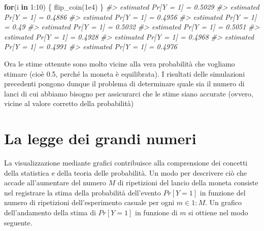 \documentclass[
  11pt,
]{krantz}
\makeatletter
\newenvironment{Shaded}{\begin{snugshade}}{\end{snugshade}}
\newcommand{\CommentTok}[1]{\textcolor[rgb]{0.37,0.37,0.37}{\textit{#1}}}
\newcommand{\ControlFlowTok}[1]{\textcolor[rgb]{0.27,0.27,0.27}{\textbf{#1}}}
\newcommand{\DecValTok}[1]{\textcolor[rgb]{0.06,0.06,0.06}{#1}}
\newcommand{\FloatTok}[1]{\textcolor[rgb]{0.06,0.06,0.06}{#1}}
\newcommand{\FunctionTok}[1]{\textcolor[rgb]{0,0,0}{#1}}
\newcommand{\NormalTok}[1]{#1}
\newcommand{\SpecialCharTok}[1]{\textcolor[rgb]{0,0,0}{#1}}
\newenvironment{kframe}{%
\medskip{}
\setlength{\fboxsep}{.8em}
 \def\at@end@of@kframe{}%
 \ifinner\ifhmode%
  \def\at@end@of@kframe{\end{minipage}}%
  \begin{minipage}{\columnwidth}%
 \fi\fi%
 \def\FrameCommand##1{\hskip\@totalleftmargin \hskip-\fboxsep
 \colorbox{shadecolor}{##1}\hskip-\fboxsep
     \hskip-\linewidth \hskip-\@totalleftmargin \hskip\columnwidth}%
 \MakeFramed {\advance\hsize-\width
   \@totalleftmargin\z@ \linewidth\hsize
   \@setminipage}}%
 {\par\unskip\endMakeFramed%
 \at@end@of@kframe}
\renewenvironment{Shaded}{\begin{kframe}}{\end{kframe}}
\theoremstyle{definition}
\theoremstyle{definition}
\theoremstyle{definition}
\theoremstyle{definition}
\theoremstyle{remark}
\makeatother
\begin{document}
\begin{Shaded}
\begin{Highlighting}[]
\ControlFlowTok{for}\NormalTok{(i }\ControlFlowTok{in} \DecValTok{1}\SpecialCharTok{:}\DecValTok{10}\NormalTok{) \{}
  \FunctionTok{flip\_coin}\NormalTok{(}\FloatTok{1e4}\NormalTok{)}
\NormalTok{\}}
\CommentTok{\#\textgreater{} estimated Pr[Y = 1] = 0.5029 }
\CommentTok{\#\textgreater{} estimated Pr[Y = 1] = 0.4886 }
\CommentTok{\#\textgreater{} estimated Pr[Y = 1] = 0.4956 }
\CommentTok{\#\textgreater{} estimated Pr[Y = 1] = 0.49 }
\CommentTok{\#\textgreater{} estimated Pr[Y = 1] = 0.5032 }
\CommentTok{\#\textgreater{} estimated Pr[Y = 1] = 0.5051 }
\CommentTok{\#\textgreater{} estimated Pr[Y = 1] = 0.4928 }
\CommentTok{\#\textgreater{} estimated Pr[Y = 1] = 0.4968 }
\CommentTok{\#\textgreater{} estimated Pr[Y = 1] = 0.4991 }
\CommentTok{\#\textgreater{} estimated Pr[Y = 1] = 0.4976}
\end{Highlighting}
\end{Shaded}

\noindent Ora le stime ottenute sono molto vicine alla vera probabilità che vogliamo stimare (cioè 0.5, perché la moneta è equilibrata). I risultati delle simulazioni precedenti pongono dunque il problema di determinare quale sia il numero di lanci di cui abbiamo bisogno per assicurarci che le stime siano accurate (ovvero, vicine al valore corretto della probabilità)

\hypertarget{la-legge-dei-grandi-numeri}{%
\section{La legge dei grandi numeri}\label{la-legge-dei-grandi-numeri}}

La visualizzazione mediante grafici contribuisce alla comprensione dei concetti della statistica e della teoria delle probabilità. Un modo per descrivere ciò che accade all'aumentare del numero \(M\) di ripetizioni del lancio della moneta consiste nel registrare la stima della probabilità dell'evento \(Pr[Y = 1]\) in funzione del numero di ripetizioni dell'esperimento casuale per ogni \(m \in 1 : M.\) Un grafico dell'andamento della stima di \(Pr[Y = 1]\) in funzione di \(m\) si ottiene nel modo seguente.
\end{document}
